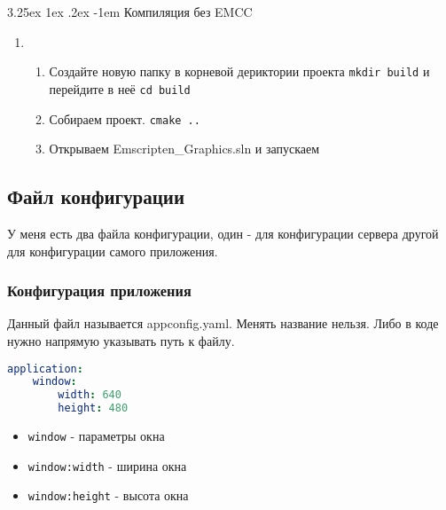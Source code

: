 \documentclass[12pt]{article}
\makeatletter
\renewcommand\paragraph{\@startsection{paragraph}{5}{\z@}%
  {3.25ex \@plus1ex \@minus.2ex}%
  {-1em}%
  {\normalfont\normalsize\bfseries}}
\makeatother
\begin{document}
\begin{enumerate}
\begin{tcolorbox}[colback=yellow!10!white,colframe=red!75!black]
        \paragraph{Компиляция без EMCC}
          \begin{enumerate}
            \item 
            \begin{enumerate}
              \item Создайте новую папку в корневой дериктории проекта
              \colorbox{gray!25!}{\texttt{mkdir build}} и перейдите в неё 
              \colorbox{gray!25!}{\texttt{cd build}}
              \item Собираем проект.
              \colorbox{gray!25!}{\texttt{cmake ..}}
              \item Открываем Emscripten\_Graphics.sln и запускаем
            \end{enumerate}
          \end{enumerate}
        \end{tcolorbox}
    \end{enumerate}
  \subsection{Файл конфигурации}
  \label{sec:config_file}
  У меня есть два файла конфигурации, один - для конфигурации сервера другой 
  для конфигурации самого приложения.
  \subsubsection{Конфигурация приложения}
  Данный файл называется appconfig.yaml. Менять название нельзя. Либо в 
  коде нужно напрямую указывать путь к файлу.\\[0.3cm]
  \begin{minipage}{\textwidth}
    \begin{multicols}{2}
      \begin{tcolorbox}[colback=gray!10!white,colframe=black!75!]
        \begin{lstlisting}[language=yaml]
application:
    window:
        width: 640
        height: 480
        \end{lstlisting}
    \end{tcolorbox}
    \columnbreak
    \begin{itemize}
      \item \texttt{window} - параметры окна
      \item \texttt{window:width} - ширина окна 
      \item \texttt{window:height} - высота окна 
    \end{itemize}
    \end{multicols}

\end{minipage}
\end{document}
